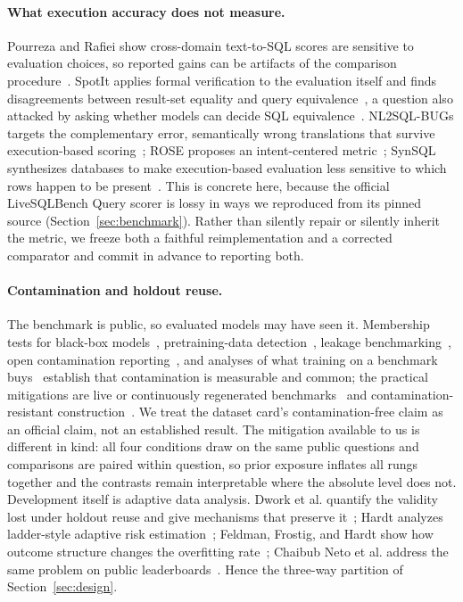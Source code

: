 \paragraph{What execution accuracy does not measure.}
Pourreza and Rafiei show cross-domain text-to-SQL scores are sensitive to
evaluation choices, so reported gains can be artifacts of the comparison
procedure~\cite{arxiv-2310-18538}. SpotIt applies formal verification to the
evaluation itself and finds disagreements between result-set equality and query
equivalence~\cite{arxiv-2510-26840}, a question also attacked by asking whether
models can decide SQL equivalence~\cite{arxiv-2312-10321}. NL2SQL-BUGs targets
the complementary error, semantically wrong translations that survive
execution-based scoring~\cite{arxiv-2503-11984}; ROSE proposes an intent-centered
metric~\cite{arxiv-2604-12988}; SynSQL synthesizes databases to make
execution-based evaluation less sensitive to which rows happen to be
present~\cite{arxiv-2604-27261}. This is concrete here, because the official
LiveSQLBench Query scorer is lossy in ways we reproduced from its pinned source
(Section~\ref{sec:benchmark}). Rather than silently repair or silently inherit
the metric, we freeze both a faithful reimplementation and a corrected comparator
and commit in advance to reporting both.

\paragraph{Contamination and holdout reuse.}
The benchmark is public, so evaluated models may have seen it. Membership tests
for black-box models~\cite{arxiv-2310-17623}, pretraining-data
detection~\cite{arxiv-2310-16789}, leakage benchmarking~\cite{arxiv-2404-18824},
open contamination reporting~\cite{arxiv-2310-17589}, and analyses of what
training on a benchmark buys~\cite{arxiv-2409-01790} establish that contamination
is measurable and common; the practical mitigations are live or continuously
regenerated benchmarks~\cite{arxiv-2406-19314} and contamination-resistant
construction~\cite{arxiv-2505-08389}. We treat the dataset card's
contamination-free claim as an official claim, not an established result. The
mitigation available to us is different in kind: all four conditions draw on the
same public questions and comparisons are paired within question, so prior
exposure inflates all rungs together and the contrasts remain interpretable where
the absolute level does not. Development itself is adaptive data analysis. Dwork
et al. quantify the validity lost under holdout reuse and give mechanisms that
preserve it~\cite{arxiv-1506-02629}; Hardt analyzes ladder-style adaptive risk
estimation~\cite{arxiv-1706-02733}; Feldman, Frostig, and Hardt show how outcome
structure changes the overfitting rate~\cite{arxiv-1905-10360}; Chaibub Neto et
al. address the same problem on public
leaderboards~\cite{arxiv-1607-00091}. Hence the three-way partition of
Section~\ref{sec:design}.

